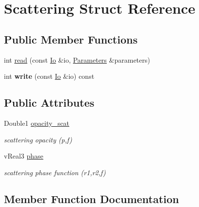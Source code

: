 \hypertarget{structScattering}{}\section{Scattering Struct Reference}
\label{structScattering}
\subsection*{Public Member Functions}
\begin{DoxyCompactItemize}
\item 
int \mbox{\hyperlink{structScattering_ac3909528ace9e53538440f76f8824b91}{read}} (const \mbox{\hyperlink{structIo}{Io}} \&io, \mbox{\hyperlink{classParameters}{Parameters}} \&parameters)
\item 
\mbox{\label{structScattering_a14889ef381d7b24bbd16bcb14bcea1d3}} 
int {\bfseries write} (const \mbox{\hyperlink{structIo}{Io}} \&io) const
\end{DoxyCompactItemize}
\subsection*{Public Attributes}
\begin{DoxyCompactItemize}
\item 
\mbox{\label{structScattering_aec5ab7323dc077bcb38beb6886a9574f}} 
Double1 \mbox{\hyperlink{structScattering_aec5ab7323dc077bcb38beb6886a9574f}{opacity\+\_\+scat}}
\begin{DoxyCompactList}\small\item\em scattering opacity (p,f) \end{DoxyCompactList}\item 
\mbox{\label{structScattering_adaf15874fa43ea779b83b45c68e8323d}} 
v\+Real3 \mbox{\hyperlink{structScattering_adaf15874fa43ea779b83b45c68e8323d}{phase}}
\begin{DoxyCompactList}\small\item\em scattering phase function (r1,r2,f) \end{DoxyCompactList}\end{DoxyCompactItemize}


\subsection{Member Function Documentation}
\mbox{\label{structScattering_ac3909528ace9e53538440f76f8824b91}} 
